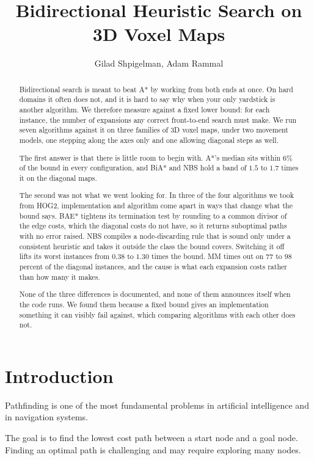 \documentclass[letterpaper]{article} %
\title{Bidirectional Heuristic Search on 3D Voxel Maps}
\author{
  Gilad Shpigelman,
  Adam Rammal
}
\begin{document}
\maketitle

\begin{abstract} Bidirectional search is meant to beat A* by working from both ends at once. On hard domains it often does not, and it is hard to say why when your only yardstick is another algorithm. We therefore measure against a fixed lower bound: for each instance, the number of expansions any correct front-to-end search must make. We run seven algorithms against it on three families of 3D voxel maps, under two movement models, one stepping along the axes only and one allowing diagonal steps as well.

  The first answer is that there is little room to begin with. A*'s median sits within $6\%$ of the bound in every configuration, and BiA* and NBS hold a band of $1.5$ to $1.7$ times it on the diagonal maps.

  The second was not what we went looking for. In three of the four algorithms we took from HOG2, implementation and algorithm come apart in ways that change what the bound says. BAE* tightens its termination test by rounding to a common divisor of the edge costs, which the diagonal costs do not have, so it returns suboptimal paths with no error raised. NBS compiles a node-discarding rule that is sound only under a consistent heuristic and takes it outside the class the bound covers. Switching it off lifts its worst instances from $0.38$ to $1.30$ times the bound. MM times out on $77$ to $98$ percent of the diagonal instances, and the cause is what each expansion costs rather than how many it makes.

  None of the three differences is documented, and none of them announces itself when the code runs. We found them because a fixed bound gives an implementation something it can visibly fail against, which comparing algorithms with each other does not.
\end{abstract}

\section{Introduction}

Pathfinding is one of the most fundamental problems in artificial intelligence and in navigation systems.

The goal is to find the lowest cost path between a start node and a goal node. Finding an optimal path is challenging and may require exploring many nodes.
\end{document}
